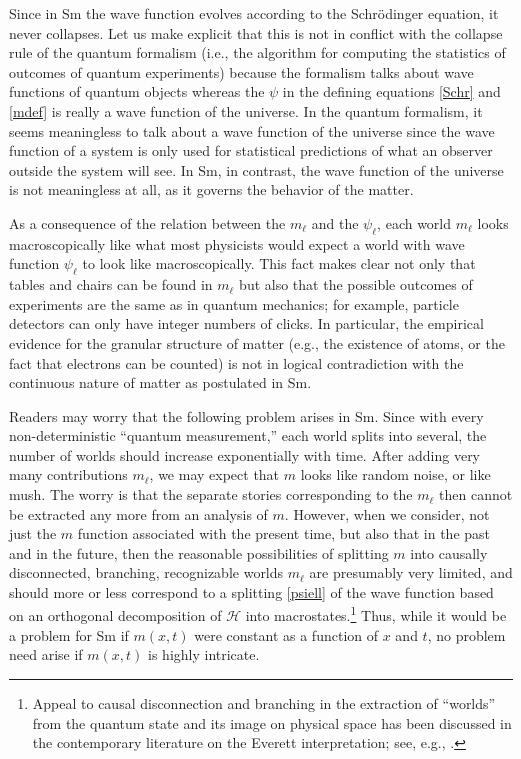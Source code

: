\documentclass[12pt]{article}
\newcommand{\Hilbert}{\mathscr{H}}
\newcommand{\x}[1]{{#1}}
\newcommand{\z}[1]{{#1}}
\begin{document}
Since in Sm the wave function evolves according to the Schr\"odinger equation, it never collapses. Let us make explicit that this is not in conflict with the collapse rule of the quantum formalism (i.e., the algorithm for computing the statistics of outcomes of quantum experiments) because the formalism talks about wave functions of quantum objects whereas the $\psi$ in the defining equations \eqref{Schr} and \eqref{mdef} is really a wave function of the universe. In the quantum formalism, it seems meaningless to talk about a wave function of the universe since the wave function of a system is only used for statistical predictions of what an observer outside the system will see. In Sm, in contrast, the wave function of the universe is not meaningless at all, as it governs the behavior of the matter. 

As a consequence of the relation between the $m_\ell$ and the $\psi_\ell$, each world $m_\ell$ looks macroscopically like what most physicists would expect a world with wave function $\psi_\ell$ to look like macroscopically. This fact makes clear not only that tables and chairs can be found in $m_\ell$ but also that the possible outcomes of experiments are the same as in quantum mechanics; for example, particle detectors can only have integer numbers of clicks. In particular, the empirical evidence for the granular structure of matter (e.g., the existence of atoms, or the fact that electrons can be counted) is not in logical contradiction with the continuous nature of matter as postulated in Sm.


\z{Readers may worry that the following \z{problem} arises in Sm. Since with every \x{non-deterministic} ``quantum measurement,'' each world splits into \x{several}, the number of worlds should increase exponentially with time. After adding very many contributions $m_\ell$, we may expect that $m$ looks like random noise, or like mush. The worry is that the separate stories corresponding to the $m_\ell$ then cannot be extracted any more from an analysis of $m$. However, when \x{we consider,} not just the $m$ function associated with the
present time, but also that in the past and in the future, then the
reasonable possibilities of splitting $m$ into causally disconnected,
branching, recognizable worlds $m_\ell$ are presumably very limited, and
\x{should more or less correspond to a splitting \eqref{psiell} of the wave
function} \z{based on an orthogonal decomposition of $\Hilbert$ into macrostates.}\footnote{\z{Appeal to causal disconnection and branching in the extraction of ``worlds'' from the quantum state and its image on physical space has been discussed in the contemporary literature on the Everett interpretation; see, e.g., \cite{saunders95, wallace03}.}}
 Thus, while it would be a problem for Sm if $m(x,t)$ were constant
as a function of $x$ and $t$, no problem \x{need arise} if $m(x,t)$ is highly \x{intricate}.}
\end{document}
